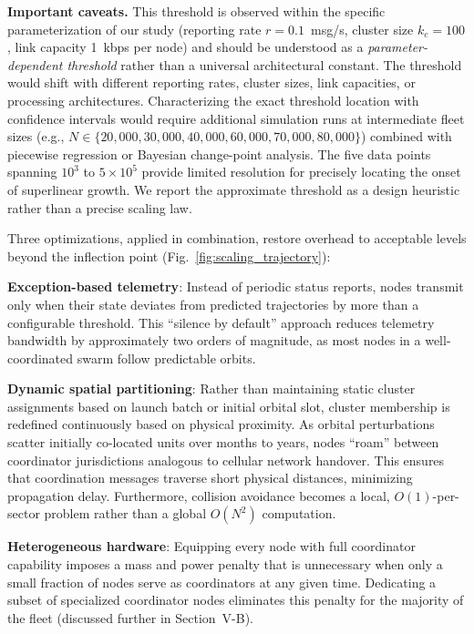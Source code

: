 \documentclass[journal]{IEEEtran}
\begin{document}
\textbf{Important caveats.} This threshold is observed within the specific parameterization of our study (reporting rate $r = 0.1$~msg/s, cluster size $k_c = 100$, link capacity 1~kbps per node) and should be understood as a \emph{parameter-dependent threshold} rather than a universal architectural constant. The threshold would shift with different reporting rates, cluster sizes, link capacities, or processing architectures. Characterizing the exact threshold location with confidence intervals would require additional simulation runs at intermediate fleet sizes (e.g., $N \in \{20{,}000, 30{,}000, 40{,}000, 60{,}000, 70{,}000, 80{,}000\}$) combined with piecewise regression or Bayesian change-point analysis. The five data points spanning $10^3$ to $5 \times 10^5$ provide limited resolution for precisely locating the onset of superlinear growth. We report the approximate threshold as a design heuristic rather than a precise scaling law.

Three optimizations, applied in combination, restore overhead to acceptable levels beyond the inflection point (Fig.~\ref{fig:scaling_trajectory}):

\textbf{Exception-based telemetry}: Instead of periodic status reports, nodes transmit only when their state deviates from predicted trajectories by more than a configurable threshold. This ``silence by default'' approach reduces telemetry bandwidth by approximately two orders of magnitude, as most nodes in a well-coordinated swarm follow predictable orbits.

\textbf{Dynamic spatial partitioning}: Rather than maintaining static cluster assignments based on launch batch or initial orbital slot, cluster membership is redefined continuously based on physical proximity. As orbital perturbations scatter initially co-located units over months to years, nodes ``roam'' between coordinator jurisdictions analogous to cellular network handover. This ensures that coordination messages traverse short physical distances, minimizing propagation delay. Furthermore, collision avoidance becomes a local, $O(1)$-per-sector problem rather than a global $O(N^2)$ computation.

\textbf{Heterogeneous hardware}: Equipping every node with full coordinator capability imposes a mass and power penalty that is unnecessary when only a small fraction of nodes serve as coordinators at any given time. Dedicating a subset of specialized coordinator nodes eliminates this penalty for the majority of the fleet (discussed further in Section~V-B).
\end{document}

